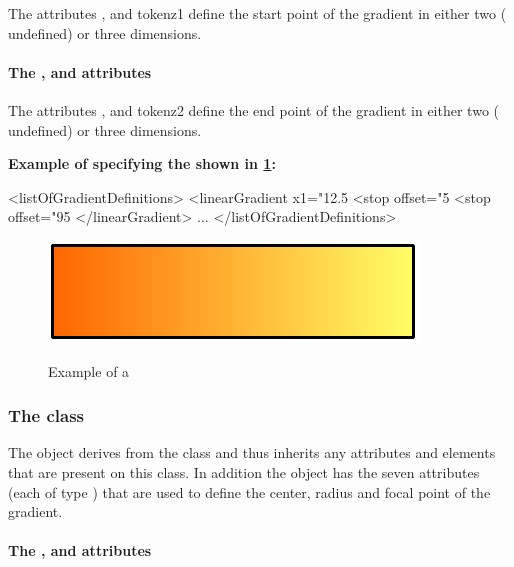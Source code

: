 The attributes ,  and token{z1} define the start point of the gradient in either two ( undefined) or three dimensions.

\paragraph{The \fixttspace{}, \fixttspace{} and \fixttspace{} attributes}

The attributes ,  and token{z2} define the end point of the gradient in either two ( undefined) or three dimensions.



{
  {\bf
Example of specifying the \LinearGradient shown in \ref{fig:lingrad}:
}
}
{\footnotesize
\begin{example}
<listOfGradientDefinitions>
  <linearGradient x1="12.5%
    <stop offset="5%
    <stop offset="95%
  </linearGradient>
        ...
</listOfGradientDefinitions>
\end{example}
}

\begin{figure}[h!]
  \centering
  \includegraphics[scale=0.5]{figures/lingrad01.pdf}\\
  \caption{Example of a \LinearGradient}
  \label{fig:lingrad}
\end{figure}


\subsubsection{The  class}
\label{radialgradient-class}


The \RadialGradient object derives from the \GradientBase class and thus
inherits any attributes and elements that are present on this class.
In addition the \RadialGradient object has the seven attributes (each of type \RelAbsVector) that are used to define the center, radius and focal point of the gradient.



\paragraph{The \fixttspace{}, \fixttspace{} and \fixttspace{} attributes}

